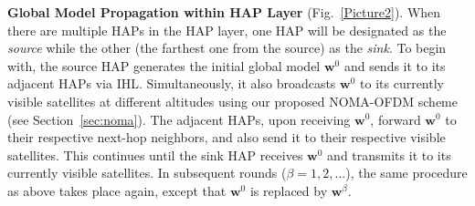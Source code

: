 \documentclass[letter,journal]{IEEEtran}
\newcommand{\fref}[1]{Fig.~\ref{#1}}
\newcommand{\sref}[1]{Section~\ref{#1}}
\begin{document}
{\bf Global Model Propagation within HAP Layer} (\fref{Picture2}). 
When there are multiple HAPs in the HAP layer, one HAP will be designated as the {\em source} while the other (the farthest one from the source) as the {\em sink}. To begin with, the source HAP generates the initial global model $\boldsymbol{w}^{0}$ and sends it to its adjacent HAPs via  IHL. Simultaneously, it also broadcasts $\boldsymbol{w}^{0}$ to its currently visible satellites at different altitudes using our proposed NOMA-OFDM scheme (see \sref{sec:noma}). The adjacent HAPs, upon receiving $\boldsymbol{w}^{0}$, forward $\boldsymbol{w}^{0}$ to their respective next-hop neighbors, and also send it to their respective visible satellites. This continues until the sink HAP receives $\boldsymbol{w}^{0}$ and transmits it to its currently visible satellites. In subsequent rounds ($\beta=1,2,...$), the same procedure as above takes place again, except that $\boldsymbol{w}^{0}$ is replaced by $\boldsymbol{w}^{\beta}$.


\end{document}
